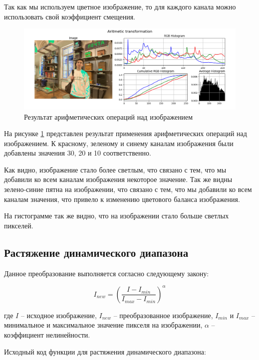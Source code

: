 \documentclass[a4paper, 12pt]{extarticle}
\begin{document}
Так как мы используем цветное изображение, то для каждого канала можно использовать свой коэффициент смещения.

\begin{figure}[h]
    \centering
    \includegraphics[width=\textwidth]{../results/Aritmetic transformation.png}
    \caption{Результат арифметических операций над изображением}
    \label{fig:aritmetic}
\end{figure}

На рисунке \ref{fig:aritmetic} представлен результат применения арифметических операций над изображением. К красному, зеленому и синему каналам изображения были добавлены значения 30, 20 и 10 соответственно.

Как видно, изображение стало более светлым, что связано с тем, что мы добавили ко всем каналам изображения некоторое значение.
Так же видны зелено-синие пятна на изображении, что связано с тем, что мы добавили ко всем каналам значения, что привело к изменению цветового баланса изображения.

На гистограмме так же видно, что на изображении стало больше светлых пикселей. 

\subsection{Растяжение динамического диапазона}

Данное преобразование выполняется согласно следующему закону: 

\begin{equation}
  I_{new} = \left( \frac{I - I_{min}}{I_{max} - I_{min}} \right)^\alpha
\end{equation}

где $I$ -- исходное изображение, $I_{new}$ -- преобразованное изображение, $I_{min}$ и $I_{max}$ -- минимальное и максимальное значение пикселя на изображении, $\alpha$ -- коэффициент нелинейности.

Исходный код функции для растяжения динамического диапазона:
\end{document}
